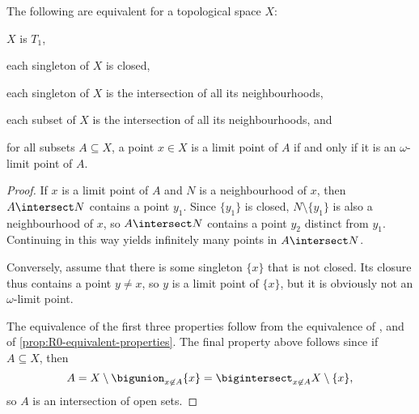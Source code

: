 \documentclass[article, a4paper, 11pt, oneside]{memoir}
\numberwithin{equation}{chapter}
\renewcommand{\iff}{\Leftrightarrow}
\begin{document}


\begin{proposition}
    The following are equivalent for a topological space $X$:
    \begin{enumprop}
        \item \label{enum:T1-space} $X$ is $T_1$,
        \item \label{enum:T1-singletons-closed} each singleton of $X$ is closed,
        \item \label{enum:T1-singleton-intersection-of-nhoods} each singleton of $X$ is the intersection of all its neighbourhoods,
        \item \label{enum:T1-subset-intersection-of-nhoods} each subset of $X$ is the intersection of all its neighbourhoods, and
        \item for all subsets $A \subseteq X$, a point $x \in X$ is a limit point of $A$ if and only if it is an $\omega$-limit point of $A$.
    \end{enumprop}
\end{proposition}

\begin{proof}
    If $x$ is a limit point of $A$ and $N$ is a neighbourhood of $x$, then $A \intersect N$ contains a point $y_1$. Since $\{y_1\}$ is closed, $N \setminus \{y_1\}$ is also a neighbourhood of $x$, so $A \intersect N$ contains a point $y_2$ distinct from $y_1$. Continuing in this way yields infinitely many points in $A \intersect N$.

    Conversely, assume that there is some singleton $\{x\}$ that is not closed. Its closure thus contains a point $y \neq x$, so $y$ is a limit point of $\{x\}$, but it is obviously not an $\omega$-limit point.




    The equivalence of the first three properties follow from the equivalence of ,  and  of \cref{prop:R0-equivalent-properties}. The final property  above follows since if $A \subseteq X$, then
    \begin{equation*}
        A   = X \setminus \bigunion_{x \not\in A} \{x\}
            = \bigintersect_{x \not\in A} X \setminus \{x\},
    \end{equation*}
    so $A$ is an intersection of open sets.
\end{proof}
\end{document}
